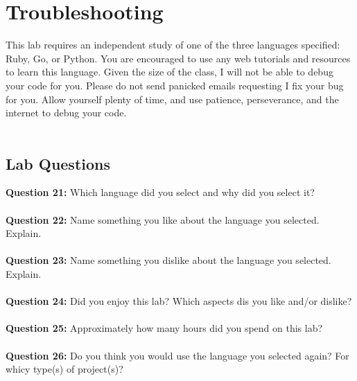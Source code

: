 \documentclass{article}
\begin{document}
\section*{Troubleshooting}
This lab requires an independent study of one of the three languages specified: Ruby, Go, or Python. You are encouraged to use any web tutorials and resources to learn this language. Given the size of the class, I will not be able to debug your code for you. Please do not send panicked emails requesting I fix your bug for you. Allow yourself plenty of time, and use patience, perseverance, and the internet to debug your code.
\\\\
\begin{tcolorbox}
 \section*{Lab Questions}
 \textbf{Question 21:} Which language did you select and why did you select it?
 \\\\
 \textbf{Question 22:} Name something you like about the language you selected. Explain.
 \\\\
 \textbf{Question 23:} Name something you dislike about the language you selected. Explain.
 \\\\
 \textbf{Question 24:} Did you enjoy this lab? Which aspects dis you like and/or dislike?
 \\\\
 \textbf{Question 25:} Approximately how many hours did you spend on this lab?
 \\\\
 \textbf{Question 26:} Do you think you would use the language you selected again? For whicy type(s) of project(s)?
 
\end{tcolorbox}
\end{document}
